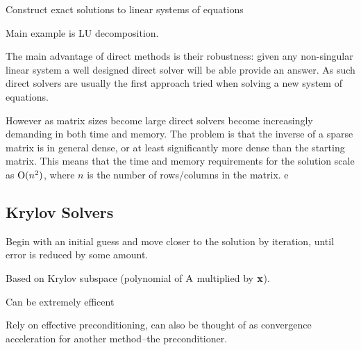 Construct exact solutions to linear systems of equations

Main example is LU decomposition.

The main advantage of direct methods is their robustness: given any non-singular linear system a well designed direct solver will be able provide an answer.
As such direct solvers are usually the first approach tried when solving a new system of equations.

However as matrix sizes become large direct solvers become increasingly demanding in both time and memory.
The problem is that the inverse of a sparse matrix is in general dense, or at least significantly more dense than the starting matrix.
This means that the time and memory requirements for the solution scale as $\text{O}(n^2)$, where $n$ is the number of rows/columns in the matrix.
e


\subsection{Krylov Solvers}
\label{sec:krylov-solvers}

Begin with an initial guess and move closer to the solution by iteration, until error is reduced by some amount.

Based on Krylov subspace (polynomial of $\mathrm{A}$ multiplied by $\mathbf{x}$).

Can be extremely efficent

Rely on effective preconditioning, can also be thought of as convergence acceleration for another method--the preconditioner.






